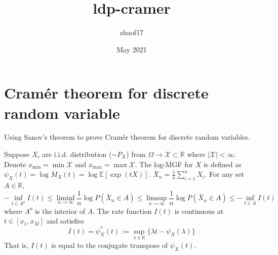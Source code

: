 \documentclass{article}
\title{ldp-cramer}
\author{zhaof17 }
\date{May 2021}
\begin{document}
\maketitle

\section{Cramér theorem for discrete random variable}
Using Sanov's theorem to prove Cramér
theorem for discrete random variables.

Suppose $X_i$ are i.i.d. distribution
($\sim P_X$) from $\Omega \to \mathcal{X} \subset \mathbb{R}$ where
$|\mathcal{X}|<\infty$. Denote 
$x_{\min}=\min \mathcal{X}$
and $x_{\max} = \max \mathcal{X}$.
The log-MGF for $X$ is defined
as $\psi_X(t)=\log M_X(t)
=\log \mathbb{E}[\exp(t X)]$.
$\bar{X}_n=\frac{1}{n}\sum_{i=1}^n X_i$.
For any set $A \in \mathbb{R}$,
\begin{equation}\label{eq:cramer}
    -\inf_{t \in A^o} I(t)
    \leq 
    \liminf_{n\to\infty} \frac{1}{n}
    \log P(\bar{X}_n \in A)
    \leq 
    \limsup_{n\to\infty} \frac{1}{n}
    \log P(\bar{X}_n \in A)
    \leq -\inf_{t \in A} I(t)
\end{equation}
where $A^o$ is the interior of $A$.
The rate function $I(t)$
is continuous at $t\in [x_{1}, x_{M}]$ and satisfies
\begin{equation}
    I(t) = \psi_X^*(t):=\sup_{\lambda \in \mathbb{R}}
    \{\lambda t - \psi_X(\lambda)\}
\end{equation}
That is, $I(t)$ is equal to the conjugate transpose of $\psi_X(t)$.
\end{document}
